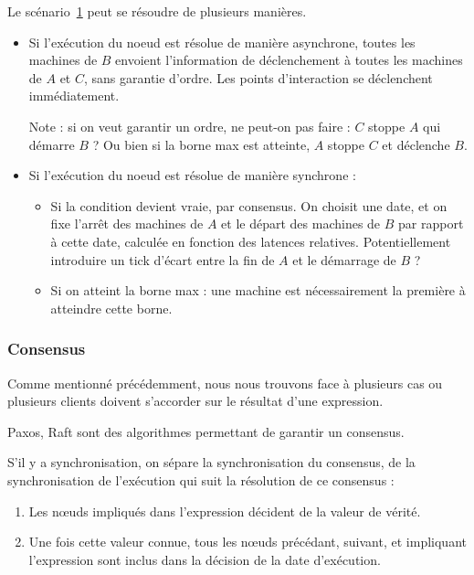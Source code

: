 \documentclass{article}
\newcommand\triggers{points d'interaction\xspace}
\begin{document}
\begin{figure}[h]
    \centering
    \begin{tikzpicture}
    
    \end{tikzpicture}
    \label{scenar.trigger-1}
\end{figure}

Le scénario~\ref{scenar.trigger-1} peut se résoudre de plusieurs manières.

\begin{itemize}
    \item Si l'exécution du noeud est résolue de manière asynchrone, toutes les machines de $B$ envoient l'information de déclenchement à toutes les machines de $A$ et $C$, sans garantie d'ordre. Les \triggers se déclenchent immédiatement.
    
    Note : si on veut garantir un ordre, ne peut-on pas faire : $C$ stoppe $A$ qui démarre $B$ ? Ou bien si la borne max est atteinte, $A$ stoppe $C$ et déclenche $B$.
    
    \item Si l'exécution du noeud est résolue de manière synchrone : 
    \begin{itemize}
        \item Si la condition devient vraie, par consensus. On choisit une date, et on fixe l'arrêt des machines de $A$ et le départ des machines de $B$ par rapport à cette date, calculée en fonction des latences relatives. Potentiellement introduire un tick d'écart entre la fin de $A$ et le démarrage de $B$ ?
        \item Si on atteint la borne max : une machine est nécessairement la première à atteindre cette borne.
    \end{itemize}
\end{itemize}

\subsubsection{Consensus}\label{section.consensus}
Comme mentionné précédemment, nous nous trouvons face à plusieurs cas 
ou plusieurs clients doivent s'accorder sur le résultat d'une expression.

Paxos, Raft sont des algorithmes permettant de garantir un consensus.%

S'il y a synchronisation, on sépare la synchronisation du consensus, de la synchronisation de l'exécution qui suit la résolution de ce consensus : 
\begin{enumerate}
    \item Les nœuds impliqués dans l'expression décident de la valeur de vérité.
    \item Une fois cette valeur connue, tous les nœuds précédant, suivant, et impliquant l'expression sont inclus dans la décision de la date d'exécution.
\end{enumerate}
\end{document}
